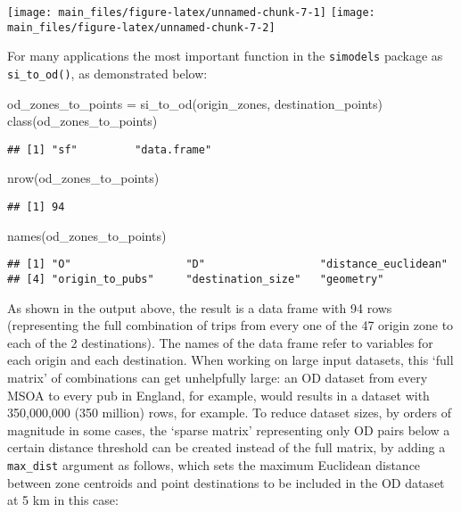 \documentclass[11pt,letterpaper]{article}
\newenvironment{Shaded}{\begin{snugshade}}{\end{snugshade}}
\newcommand{\FunctionTok}[1]{\textcolor[rgb]{0.00,0.00,0.00}{#1}}
\newcommand{\NormalTok}[1]{#1}
\newcommand{\OtherTok}[1]{\textcolor[rgb]{0.56,0.35,0.01}{#1}}
\begin{document}
\texttt{[image: main\_files/figure-latex/unnamed-chunk-7-1]} \texttt{[image: main\_files/figure-latex/unnamed-chunk-7-2]}

For many applications the most important function in the \texttt{simodels} package as \texttt{si\_to\_od()}, as demonstrated below:

\begin{Shaded}
\begin{Highlighting}[]
\NormalTok{od\_zones\_to\_points }\OtherTok{=} \FunctionTok{si\_to\_od}\NormalTok{(origin\_zones, destination\_points)}
\FunctionTok{class}\NormalTok{(od\_zones\_to\_points)}
\end{Highlighting}
\end{Shaded}

\begin{verbatim}
## [1] "sf"         "data.frame"
\end{verbatim}

\begin{Shaded}
\begin{Highlighting}[]
\FunctionTok{nrow}\NormalTok{(od\_zones\_to\_points)}
\end{Highlighting}
\end{Shaded}

\begin{verbatim}
## [1] 94
\end{verbatim}

\begin{Shaded}
\begin{Highlighting}[]
\FunctionTok{names}\NormalTok{(od\_zones\_to\_points)}
\end{Highlighting}
\end{Shaded}

\begin{verbatim}
## [1] "O"                  "D"                  "distance_euclidean"
## [4] "origin_to_pubs"     "destination_size"   "geometry"
\end{verbatim}

As shown in the output above, the result is a data frame with 94 rows (representing the full combination of trips from every one of the 47 origin zone to each of the 2 destinations).
The names of the data frame refer to variables for each origin and each destination.
When working on large input datasets, this `full matrix' of combinations can get unhelpfully large: an OD dataset from every MSOA to every pub in England, for example, would results in a dataset with 350,000,000 (350 million) rows, for example.
To reduce dataset sizes, by orders of magnitude in some cases, the `sparse matrix' representing only OD pairs below a certain distance threshold can be created instead of the full matrix, by adding a \texttt{max\_dist} argument as follows, which sets the maximum Euclidean distance between zone centroids and point destinations to be included in the OD dataset at 5 km in this case:
\end{document}
